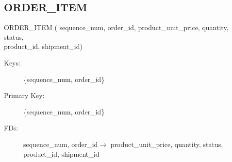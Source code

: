 \documentclass[hidelinks,12pt]{article}
\begin{document}
\begin{enumerate}
\section{ORDER\_ITEM} ORDER\_ITEM ( sequence\_num, order\_id, product\_unit\_price, quantity, status,
                    \\product\_id, shipment\_id) 
\begin{description}
    \item[Keys:] \{sequence\_num, order\_id\}
    \item[Primary Key:] \{sequence\_num, order\_id\}
     \item[FDs:]  sequence\_num, order\_id$\rightarrow$ product\_unit\_price, quantity, status,
     \\product\_id, shipment\_id

\end{description}
\end{enumerate}
\end{document}
